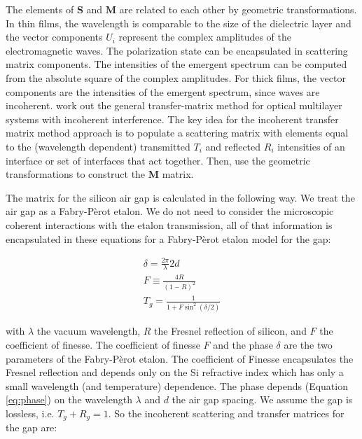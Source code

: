 The elements of $\boldsymbol{S}$ and $\boldsymbol{M}$ are related to each other by geometric transformations\cite{2007fuph.book.....S}.  In thin films, the wavelength is comparable to the size of the dielectric layer and the vector components $U_{i}$ represent the complex amplitudes of the electromagnetic waves.  The polarization state can be encapsulated in scattering matrix components\cite{2007fuph.book.....S}.  The intensities of the emergent spectrum can be computed from the absolute square of the complex amplitudes.  For thick films, the vector components are the intensities of the emergent spectrum, since waves are incoherent.  \cite{2002ApOpt..41.3978K} work out the general transfer-matrix method for optical multilayer systems with incoherent interference.  The key idea for the incoherent transfer matrix method approach is to populate a scattering matrix with elements equal to the (wavelength dependent) transmitted $T_i$ and reflected $R_i$ intensities of an interface or set of interfaces that act together.  Then, use the geometric transformations to construct the $\boldsymbol{M}$ matrix.

The matrix for the silicon air gap is calculated in the following way.  We treat the air gap as a Fabry-P\`erot etalon.  We do not need to consider the microscopic coherent interactions with the etalon transmission, all of that information is encapsulated in these equations for a Fabry-P\`erot etalon model for the gap:

\begin{eqnarray}
 \delta = \frac{2\pi}{\lambda}2d \label{eq:phase} \\
  F \equiv \frac{4R}{(1-R)^2} \\
 T_g = \frac{1}{1+F\sin^2(\delta/2)}  \label{eq:FabPerot}
\end{eqnarray}

with $\lambda$ the vacuum wavelength, $R$ the Fresnel reflection of silicon, and $F$ the coefficient of finesse.  The coefficient of finesse $F$ and the phase $\delta$ are the two parameters of the Fabry-P\`erot etalon.  The coefficient of Finesse encapsulates the Fresnel reflection and depends only on the Si refractive index which has only a small wavelength (and temperature) dependence.  The phase depends (Equation \ref{eq:phase}) on the wavelength $\lambda$ and $d$ the air gap spacing.  We assume the gap is lossless, i.e. $T_g+R_g=1$.  So the incoherent scattering and transfer matrices for the gap are:

